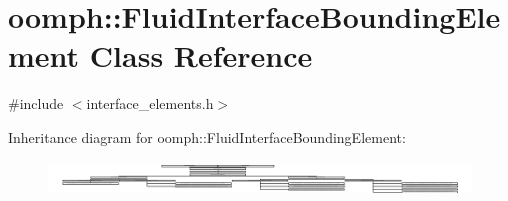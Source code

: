 \hypertarget{classoomph_1_1FluidInterfaceBoundingElement}{}\section{oomph\+:\+:Fluid\+Interface\+Bounding\+Element Class Reference}
\label{classoomph_1_1FluidInterfaceBoundingElement}


{\ttfamily \#include $<$interface\+\_\+elements.\+h$>$}

Inheritance diagram for oomph\+:\+:Fluid\+Interface\+Bounding\+Element\+:\begin{figure}[H]
\begin{center}
\leavevmode
\includegraphics[height=0.936768cm]{classoomph_1_1FluidInterfaceBoundingElement}
\end{center}
\end{figure}
